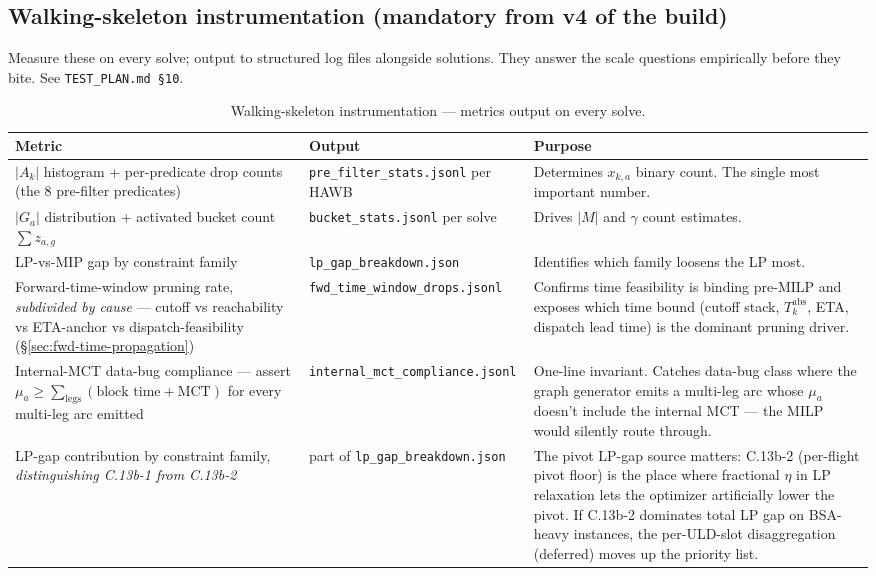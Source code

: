 \documentclass[11pt,a4paper]{article}
\theoremstyle{definition}
\begin{document}
\subsection*{Walking-skeleton instrumentation (mandatory from v4 of the build)}
\label{sec:walking-skeleton-instrumentation}

Measure these on every solve; output to structured log files alongside
solutions. They answer the scale questions empirically before they bite.
See \texttt{TEST\_PLAN.md \S10}.

\begin{table}[H]
\centering
\small
\caption{Walking-skeleton instrumentation --- metrics output on every solve.}
\label{tab:walking-skeleton-metrics}
\begin{tabular}{p{4.7cm}p{4.0cm}p{6.2cm}}
\toprule
Metric & Output & Purpose \\
\midrule
$|A_k|$ histogram + per-predicate drop counts (the 8 pre-filter predicates) & \texttt{pre\_filter\_stats.jsonl} per HAWB & Determines $x_{k,a}$ binary count. The single most important number. \\
$|G_a|$ distribution + activated bucket count $\sum z_{a,g}$ & \texttt{bucket\_stats.jsonl} per solve & Drives $|M|$ and $\gamma$ count estimates. \\
LP-vs-MIP gap by constraint family & \texttt{lp\_gap\_breakdown.json} & Identifies which family loosens the LP most. \\
Forward-time-window pruning rate, \emph{subdivided by cause} --- cutoff vs reachability vs ETA-anchor vs dispatch-feasibility (\S\ref{sec:fwd-time-propagation}) & \texttt{fwd\_time\_window\_drops.jsonl} & Confirms time feasibility is binding pre-MILP and exposes which time bound (cutoff stack, $T_k^{\text{abs}}$, ETA, dispatch lead time) is the dominant pruning driver. \\
Internal-MCT data-bug compliance --- assert $\mu_a \geq \sum_{\text{legs}} (\text{block time} + \text{MCT})$ for every multi-leg arc emitted & \texttt{internal\_mct\_compliance.jsonl} & One-line invariant. Catches data-bug class where the graph generator emits a multi-leg arc whose $\mu_a$ doesn't include the internal MCT --- the MILP would silently route through. \\
LP-gap contribution by constraint family, \emph{distinguishing C.13b-1 from C.13b-2} & part of \texttt{lp\_gap\_breakdown.json} & The pivot LP-gap source matters: C.13b-2 (per-flight pivot floor) is the place where fractional $\eta$ in LP relaxation lets the optimizer artificially lower the pivot. If C.13b-2 dominates total LP gap on BSA-heavy instances, the per-ULD-slot disaggregation (deferred) moves up the priority list. \\

\end{tabular}
\end{table}
\end{document}
